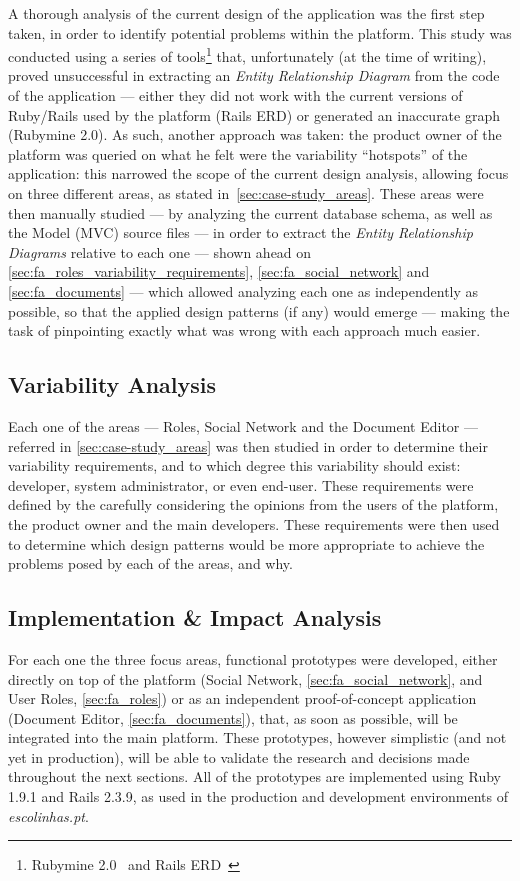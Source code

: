 A thorough analysis of the current design of the application was the first step taken, in order to identify potential problems within the platform. This study was conducted using a series of tools\footnote{Rubymine 2.0~\cite{rubymine} and Rails ERD~\cite{rails_erd}} that, unfortunately (at the time of writing), proved unsuccessful in extracting an \emph{Entity Relationship Diagram} from the code of the application --- either they did not work with the current versions of Ruby/Rails used by the platform (Rails ERD) or generated an inaccurate graph (Rubymine 2.0). As such, another approach was taken: the product owner of the platform was queried on what he felt were the variability ``hotspots'' of the application: this narrowed the scope of the current design analysis, allowing focus on three different areas, as stated in~\ref{sec:case-study_areas}. These areas were then manually studied --- by analyzing the current database schema, as well as the Model (MVC) source files --- in order to extract the \emph{Entity Relationship Diagrams} relative to each one --- shown ahead on \ref{sec:fa_roles_variability_requirements}, \ref{sec:fa_social_network} and \ref{sec:fa_documents} --- which allowed analyzing each one as independently as possible, so that the applied design patterns (if any) would emerge --- making the task of pinpointing exactly what was wrong with each approach much easier.

\subsection{Variability Analysis}\label{sec:variability_analysis}

Each one of the areas --- Roles, Social Network and the Document Editor --- referred in \ref{sec:case-study_areas} was then studied in order to determine their variability requirements, and to which degree this variability should exist: developer, system administrator, or even end-user. These requirements were defined by the carefully considering the opinions from the users of the platform, the product owner and the main developers. These requirements were then used to determine which design patterns would be more appropriate to achieve the problems posed by each of the areas, and why.

\subsection{Implementation \& Impact Analysis}

For each one the three focus areas, functional prototypes were developed, either directly on top of the platform (Social Network, \ref{sec:fa_social_network}, and User Roles, \ref{sec:fa_roles}) or as an independent proof-of-concept application (Document Editor, \ref{sec:fa_documents}), that, as soon as possible, will be integrated into the main platform. These prototypes, however simplistic (and not yet in production), will be able to validate the research and decisions made throughout the next sections. All of the prototypes are implemented using Ruby 1.9.1 and Rails 2.3.9, as used in the production and development environments of \emph{escolinhas.pt}.

